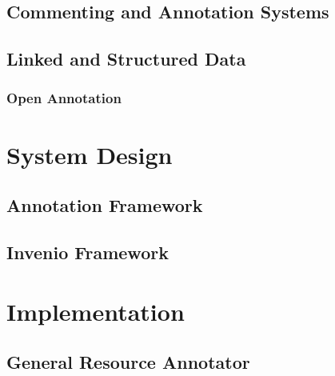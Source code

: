 \documentclass[12pt,a4paper]{report}
\begin{document}
    \section{Commenting and Annotation Systems}
      \label{sec:comments}
      

    \clearpage

    \section{Linked and Structured Data}
      \label{sec:data}
      

      \subsection{Open Annotation}
        \label{sec:oa}
        

  \cleardoublepage

  \chapter{System Design}
    \label{sec:design}
    

    \section{Annotation Framework}
      \label{sec:anno}
      

    \section{Invenio Framework}
      \label{sec:v2}
      

  \cleardoublepage

  \chapter{Implementation}
    \label{sec:impl}
    

    \section{General Resource Annotator}
      \label{sec:gra}
      

    \newpage
\end{document}

